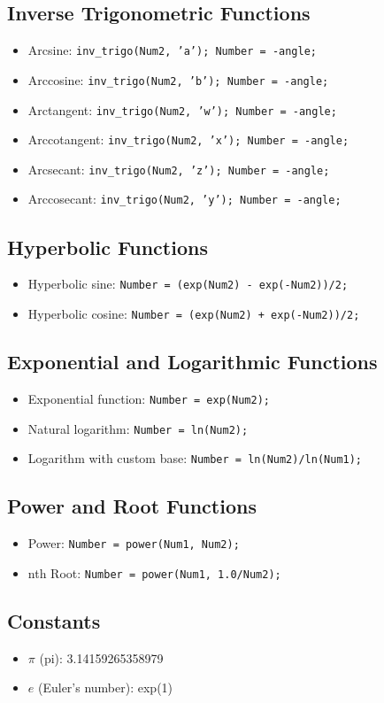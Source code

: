 \documentclass[12pt]{article}
\begin{document}
\subsection{Inverse Trigonometric Functions}
\begin{itemize}
\item Arcsine: \texttt{inv\_trigo(Num2, 'a'); Number = -angle;}
\item Arccosine: \texttt{inv\_trigo(Num2, 'b'); Number = -angle;}
\item Arctangent: \texttt{inv\_trigo(Num2, 'w'); Number = -angle;}
\item Arccotangent: \texttt{inv\_trigo(Num2, 'x'); Number = -angle;}
\item Arcsecant: \texttt{inv\_trigo(Num2, 'z'); Number = -angle;}
\item Arccosecant: \texttt{inv\_trigo(Num2, 'y'); Number = -angle;}
\end{itemize}
\subsection{Hyperbolic Functions}
\begin{itemize}
\item Hyperbolic sine: \texttt{Number = (exp(Num2) - exp(-Num2))/2;}
\item Hyperbolic cosine: \texttt{Number = (exp(Num2) + exp(-Num2))/2;}
\end{itemize}
\subsection{Exponential and Logarithmic Functions}
\begin{itemize}
\item Exponential function: \texttt{Number = exp(Num2);}
\item Natural logarithm: \texttt{Number = ln(Num2);}
\item Logarithm with custom base: \texttt{Number = ln(Num2)/ln(Num1);}
\end{itemize}
\subsection{Power and Root Functions}
\begin{itemize}
\item Power: \texttt{Number = power(Num1, Num2);}
\item nth Root: \texttt{Number = power(Num1, 1.0/Num2);}
\end{itemize}
\subsection{Constants}
\begin{itemize}
\item $\pi$ (pi): 3.14159265358979
\item $e$ (Euler's number): exp(1)
\end{itemize}
\end{document}
